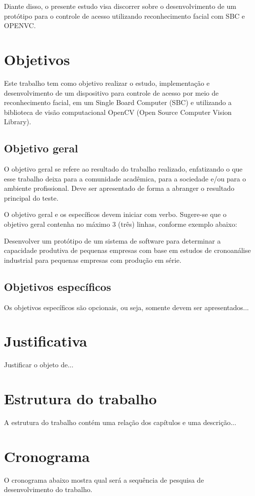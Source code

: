 Diante disso, o presente estudo visa discorrer sobre o desenvolvimento de um protótipo 
para o controle de acesso utilizando reconhecimento facial com SBC e OPENVC.

\section{Objetivos}\label{sec:objetivos}

Este trabalho tem como objetivo realizar o estudo, implementação e desenvolvimento 
de um dispositivo para controle de acesso por meio de reconhecimento facial, em um Single 
Board Computer (SBC) e utilizando a biblioteca de visão computacional OpenCV (Open Source 
Computer Vision Library).

\subsection{Objetivo geral}\label{subsec:objetivoGeral}

O objetivo geral se refere ao resultado do trabalho realizado, enfatizando o que esse 
trabalho deixa para a comunidade acadêmica, para a sociedade e/ou para o ambiente profissional. 
Deve ser apresentado de forma a abranger o resultado principal do teste.

O objetivo geral e os específicos devem iniciar com verbo. Sugere-se que o objetivo geral 
contenha no máximo 3 (três) linhas, conforme exemplo abaixo:

Desenvolver um protótipo de um sistema de software para determinar a capacidade 
produtiva de pequenas empresas com base em estudos de cronoanálise industrial para pequenas 
empresas com produção em série.

\subsection{Objetivos específicos}\label{subsec:objetivosEspecificos}

Os objetivos específicos são opcionais, ou seja, somente devem ser apresentados...

\section{Justificativa}\label{sec:justificativa}

Justificar o objeto de...

\section{Estrutura do trabalho}\label{sec:estruturaTrabalho}

A estrutura do trabalho contém uma relação dos capítulos e uma descrição...

\section{Cronograma}\label{sec:cronograma}

O cronograma abaixo mostra qual será a sequência de pesquisa de
desenvolvimento do trabalho.

